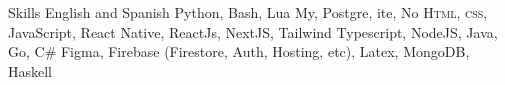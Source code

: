 
\begin{rubric}{Skills}
\entry*[Languages]
	English and Spanish
	Python, Bash, Lua
\entry*[Databases]
	My, Postgre, ite, No
	\textsc{Html, css}, JavaScript, React Native, ReactJs, NextJS, Tailwind
 \entry*[Backend]
	Typescript, NodeJS, Java, Go, C\#
\entry*[Misc.]
	Figma, Firebase (Firestore, Auth, Hosting, etc), Latex, MongoDB, Haskell
\end{rubric}
